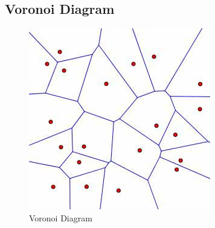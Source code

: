 \documentclass{article}
\begin{document}
\begin{appendix}
\section{Voronoi Diagram}
\begin{figure}[H]
	\centering
    \label{voronoipic}
    \includegraphics[scale=0.65]{voronoi.jpg}
    \caption{Voronoi Diagram\cite{voronoipic}}
\end{figure}
\end{appendix}
\end{document}
